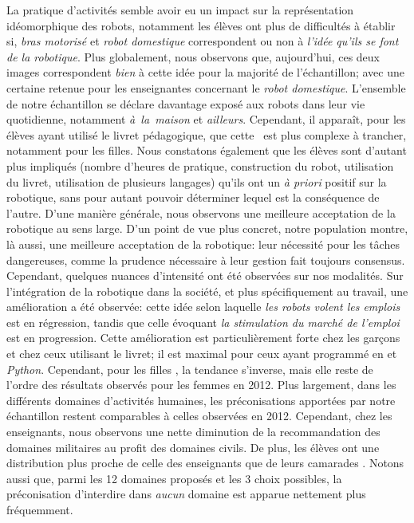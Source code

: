             La pratique d'activités semble avoir eu un impact sur la représentation idéomorphique des robots, notamment les élèves  ont plus de difficultés à établir si, \textit{bras motorisé} et \textit{robot domestique} correspondent ou non à \textit{l'idée qu'ils se font de la robotique}. Plus globalement, nous observons que, aujourd'hui, ces deux images correspondent  \textit{bien} à cette idée pour la majorité de l'échantillon; avec une certaine retenue pour les enseignantes concernant le \textit{robot domestique}. 
            L'ensemble de notre échantillon se déclare davantage exposé aux robots dans leur vie quotidienne, notamment \textit{à~la~maison} et \textit{ailleurs}. Cependant, il apparaît, pour les élèves  ayant utilisé le livret pédagogique, que cette~ est plus complexe à trancher, notamment pour les filles. 
            Nous constatons également que les élèves sont d'autant plus impliqués (\ie nombre d'heures de pratique, construction du robot, utilisation du livret, utilisation de plusieurs langages) qu'ils ont un \textit{à priori} positif sur la robotique, sans pour autant pouvoir déterminer lequel est la conséquence de l'autre. D'une manière générale, nous observons une meilleure acceptation de la robotique au sens large.
            D'un point de vue plus concret, notre population montre, là aussi, une meilleure acceptation de la robotique: leur nécessité pour les tâches dangereuses, comme la prudence nécessaire à leur gestion fait toujours consensus. Cependant, quelques nuances d'intensité ont été observées sur nos modalités.
            Sur l'intégration de la robotique dans la société, et plus spécifiquement au travail, une amélioration a été observée: cette idée selon laquelle \textit{les robots volent les emplois} est en régression, tandis que celle évoquant \textit{la stimulation du marché de l'emploi} est en progression. Cette amélioration est particulièrement forte chez les garçons  et chez ceux utilisant le livret; il est maximal pour ceux ayant programmé en  et \textit{Python}. Cependant, pour les filles , la tendance s'inverse, mais elle reste de l'ordre des résultats observés pour les femmes en 2012.
            Plus largement, dans les différents domaines d'activités humaines, les préconisations apportées par notre échantillon restent comparables à celles observées en 2012. Cependant, chez les enseignants, nous observons une nette diminution de la recommandation des domaines militaires au profit des domaines civils. De plus, les élèves  ont une distribution plus proche de celle des enseignants que de leurs camarades . Notons aussi que, parmi les 12 domaines proposés et les 3 choix possibles, la préconisation d'interdire dans \textit{aucun} domaine est apparue nettement plus fréquemment. 
